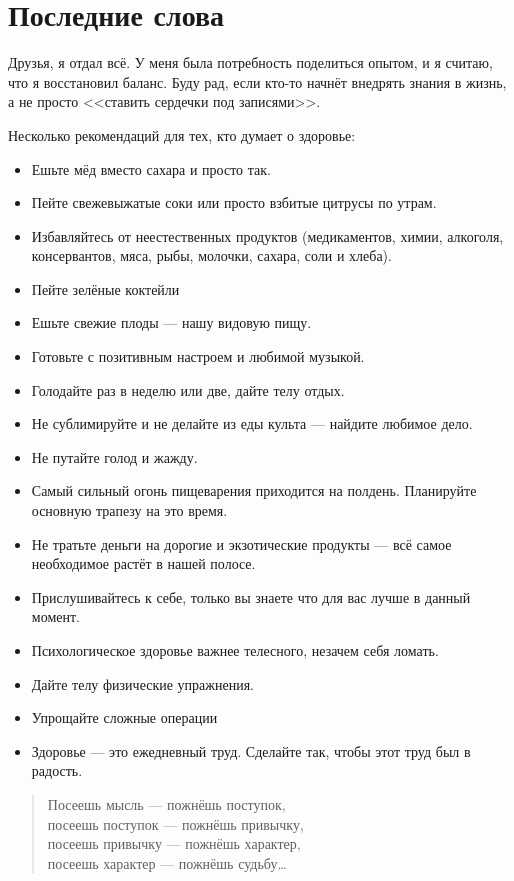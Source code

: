 \section{Последние слова}

Друзья, я отдал всё. У меня была потребность поделиться опытом, и я считаю, что я восстановил баланс. Буду рад, если кто-то начнёт внедрять знания в жизнь, а не просто <<ставить сердечки под записями>>. 

Несколько рекомендаций для тех, кто думает о здоровье:
\begin{itemize}
\item Ешьте мёд вместо сахара и просто так.
\item Пейте свежевыжатые соки или просто взбитые цитрусы по утрам.
\item  Избавляйтесь от неестественных продуктов (медикаментов, химии, алкоголя, консервантов, мяса, рыбы, молочки, сахара, соли и хлеба).
\item Пейте зелёные коктейли
\item  Ешьте свежие плоды — нашу видовую пищу.
\item Готовьте с позитивным настроем и любимой музыкой.
\item Голодайте раз в неделю или две, дайте телу отдых.
\item  Не сублимируйте и не делайте из еды культа — найдите любимое дело.
\item Не путайте голод и жажду. 
\item Самый сильный огонь пищеварения приходится на полдень. Планируйте основную трапезу на это время.
\item Не тратьте деньги на дорогие и экзотические продукты — всё самое необходимое растёт в нашей полосе.
\item  Прислушивайтесь к себе, только вы знаете что для вас лучше в данный момент.
\item Психологическое здоровье важнее телесного, незачем себя ломать.
\item Дайте телу физические упражнения.
\item Упрощайте сложные операции
\item Здоровье — это ежедневный труд. Сделайте так, чтобы этот труд был в радость.
\end{itemize}

\begin{quote}
    \centering
Посеешь мысль — пожнёшь поступок,\\
посеешь поступок — пожнёшь привычку,\\
посеешь привычку — пожнёшь характер,\\
посеешь характер — пожнёшь судьбу\ldots 
\end{quote}
